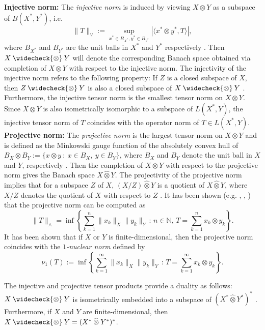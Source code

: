 \documentclass[11pt]{article}
\begin{document}
\noindent\textbf{Injective norm: } The \textit{injective norm} is induced by viewing $X \otimes Y$ as a subspace of $B(X^*,Y^*)$, i.e.
\[
\|T\|_\vee := 
\sup_{x^* \in B_{X^*}, y^* \in B_{Y^*}} |\langle x^* \otimes y^*, T\rangle|,
\]
where $B_{X^*}$ and $B_{Y^*}$ are the unit balls in $X^*$ and $Y^*$ respectively \citep[p. 46]{defant1992tensor}. 
Then $X \mathbin{\widecheck{\otimes}} Y$ will denote the corresponding Banach space obtained via completion of $X \otimes Y$ with respect to the injective norm. 
The injectivity of the injective norm refers to the following property: If $Z$ is a closed subspace of $X$, then $Z \mathbin{\widecheck{\otimes}} Y$ is also a closed subspace of $X \mathbin{\widecheck{\otimes}} Y$ \citep[Proposition~1.1.6]{diestel2008metric}. 
Furthermore, the injective tensor norm is the smallest tensor norm on $X \otimes Y$.
Since $X \otimes Y$ is also isometrically isomorphic to a subspace of $L(X^*,Y)$, the injective tensor norm of $T$ coincides with the operator norm of $T \in L(X^*,Y)$. \\

\noindent\textbf{Projective norm: } The \textit{projective norm} is the largest tensor norm on $X \otimes Y$ and is defined as the Minkowski gauge function of the absolutely convex hull of $B_X \otimes B_Y := \{x \otimes y ~:~ x \in B_X, ~ y \in B_Y\}$, where $B_X$ and $B_Y$ denote the unit ball in $X$ and $Y$, respectively \cite[p. 27]{defant1992tensor}. 
Then the completion of $X \otimes Y$ with respect to the projective norm gives the Banach space $X \mathbin{\widehat{\otimes}} Y$. 
The projectivity of the projective norm implies that for a subspace $Z$ of $X$, $(X/Z) \mathbin{\widehat{\otimes}} Y$ is a quotient of $X \mathbin{\widehat{\otimes}} Y$, where $X/Z$ denotes the quotient of $X$ with respect to $Z$ \citep[Proposition~1.1.7]{diestel2008metric}. 
It has been shown (e.g. \cite{grothendieck1956resume}, \citep[Proposition 1.1.4]{diestel2008metric}, \citep[p. 27]{defant1992tensor}) that the projective norm can be computed as 
\[
\|T\|_\wedge = \inf \left\{ \sum_{k=1}^n \|x_k\|_X \|y_k\|_Y \, : \, n \in \mathbb{N}, \, T = \sum_{k=1}^n x_k \otimes y_k \right\}.
\]
It has been shown \citep[p.~3]{pisier1986factorization} \citep[p.~19]{jameson1987summing} that if $X$ or $Y$ is finite-dimensional, then the projective norm coincides with the \textit{$1$-nuclear norm} defined by
\[
\nu_1(T) := \inf \left\{ \sum_{k=1}^\infty \|x_k\|_X \|y_k\|_Y \, : \, T = \sum_{k=1}^\infty x_k \otimes y_k \right\}.
\]

The injective and projective tensor products provide a duality as follows: $X \mathbin{\widecheck{\otimes}} Y$ is isometrically embedded into a subspace of $(X^* \mathbin{\widehat{\otimes}} Y^*)^*$ \cite[p. 47]{defant1992tensor}. Furthermore, if $X$ and $Y$ are finite-dimensional, then $X \mathbin{\widecheck{\otimes}} Y= (X^* \mathbin{\widehat{\otimes}} Y^*)^*$. 
\end{document}

